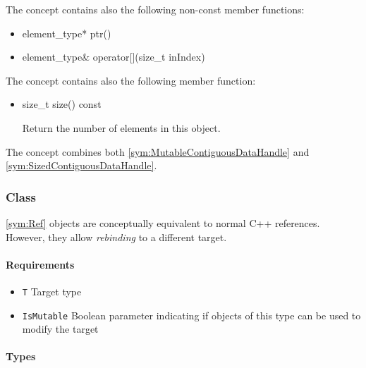 The concept  contains also the following non-const member functions:
%
\begin{itemize}
	\item
		\begin{cppsnippet}
		element_type* ptr()
		\end{cppsnippet}

	\item
		\begin{cppsnippet}
		element_type& operator[](size_t inIndex)
		\end{cppsnippet}
\end{itemize}
%
The concept  contains also the following member function:
%
\begin{itemize}
	\item
		\begin{cppsnippet}
		size_t size() const
		\end{cppsnippet}
		
		Return the number of elements in this object.
\end{itemize}
%
The concept  combines both \ref{sym:MutableContiguousDataHandle} and \ref{sym:SizedContiguousDataHandle}.

\subsubsection[Class Ref]{Class }

\ref{sym:Ref} objects are conceptually equivalent to normal C++ references. However, they allow \emph{rebinding} to a different target.

\paragraph{Requirements}

\begin{itemize}
	\item \texttt{T} Target type
	\item \texttt{IsMutable} Boolean parameter indicating if objects of this type can be used to modify the target
\end{itemize}

\paragraph{Types}

